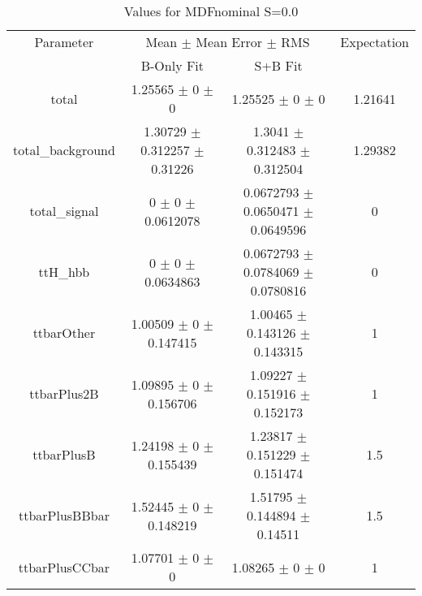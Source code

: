 \begin{table}
\centering
\caption{Values for MDFnominal S=0.0}
\begin{tabular}{cccc}
\toprule
Parameter & \multicolumn{2}{c}{Mean $\pm$ Mean Error $\pm$ RMS} & Expectation\\
 & B-Only Fit & S+B Fit & \\
\midrule
total & \num{1.25565} $\pm$ \num{0} $\pm$ \num{0} & \num{1.25525} $\pm$ \num{0} $\pm$ \num{0} & \num{1.21641}\\
total\_background & \num{1.30729} $\pm$ \num{0.312257} $\pm$ \num{0.31226} & \num{1.3041} $\pm$ \num{0.312483} $\pm$ \num{0.312504} & \num{1.29382}\\
total\_signal & \num{0} $\pm$ \num{0} $\pm$ \num{0.0612078} & \num{0.0672793} $\pm$ \num{0.0650471} $\pm$ \num{0.0649596} & \num{0}\\
ttH\_hbb & \num{0} $\pm$ \num{0} $\pm$ \num{0.0634863} & \num{0.0672793} $\pm$ \num{0.0784069} $\pm$ \num{0.0780816} & \num{0}\\
ttbarOther & \num{1.00509} $\pm$ \num{0} $\pm$ \num{0.147415} & \num{1.00465} $\pm$ \num{0.143126} $\pm$ \num{0.143315} & \num{1}\\
ttbarPlus2B & \num{1.09895} $\pm$ \num{0} $\pm$ \num{0.156706} & \num{1.09227} $\pm$ \num{0.151916} $\pm$ \num{0.152173} & \num{1}\\
ttbarPlusB & \num{1.24198} $\pm$ \num{0} $\pm$ \num{0.155439} & \num{1.23817} $\pm$ \num{0.151229} $\pm$ \num{0.151474} & \num{1.5}\\
ttbarPlusBBbar & \num{1.52445} $\pm$ \num{0} $\pm$ \num{0.148219} & \num{1.51795} $\pm$ \num{0.144894} $\pm$ \num{0.14511} & \num{1.5}\\
ttbarPlusCCbar & \num{1.07701} $\pm$ \num{0} $\pm$ \num{0} & \num{1.08265} $\pm$ \num{0} $\pm$ \num{0} & \num{1}\\
\bottomrule
\end{tabular}
\end{table}